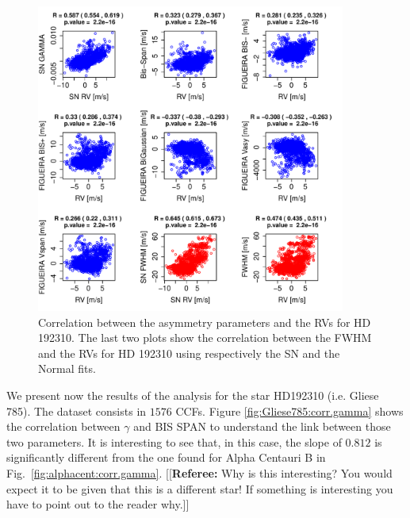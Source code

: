 \documentclass[11pt, oneside]{article}
\newcommand{\comment}[1]{{\color{red}[[\textbf{Referee: }#1]]}}
\begin{document}
%
\begin{figure}[htbp]
   \centering
\includegraphics[height = 4in]{HD19231_[4]Comparison_para.pdf} 
   \caption{Correlation between the asymmetry parameters and the RVs for HD 192310. The last two plots show the correlation between the FWHM and the RVs for HD 192310 using respectively the SN and the Normal fits.}
   \label{fig:Gliese785:corrPlot}
\end{figure}

\iffalse
We present now the results of the analysis for the star HD192310 (i.e. Gliese 785). The dataset consists in $1576$ CCFs. Figure \ref{fig:Gliese785:corr.gamma} shows the correlation between $\gamma$ and BIS SPAN to understand the link between those two parameters. It is interesting to see that, in this case, the slope of $0.812$ is significantly different from the one found for Alpha Centauri B in Fig.~\ref{fig:alphacent:corr.gamma}.
\comment{Why is this interesting? You would expect it to be given that this is a different star! If something is interesting you have to point out to the reader why.}
\end{document}
